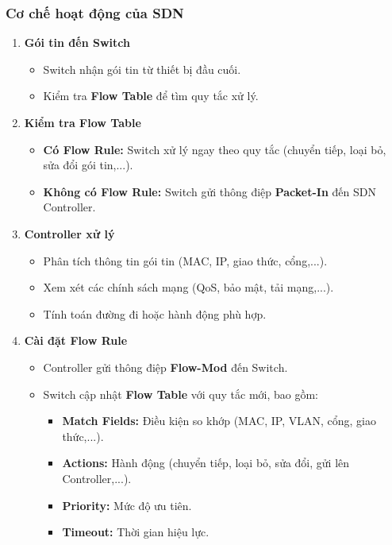 \subsubsection{Cơ chế hoạt động của SDN}
\begin{enumerate}
    \item \textbf{Gói tin đến Switch}
    \begin{itemize}
        \item Switch nhận gói tin từ thiết bị đầu cuối.
        \item Kiểm tra \textbf{Flow Table} để tìm quy tắc xử lý.
    \end{itemize}

    \item \textbf{Kiểm tra Flow Table}
    \begin{itemize}
        \item \textbf{Có Flow Rule:} Switch xử lý ngay theo quy tắc (chuyển tiếp, loại bỏ, sửa đổi gói tin,...).
        \item \textbf{Không có Flow Rule:} Switch gửi thông điệp \textbf{Packet-In} đến SDN Controller.
    \end{itemize}

    \item \textbf{Controller xử lý}
    \begin{itemize}
        \item Phân tích thông tin gói tin (MAC, IP, giao thức, cổng,...).
        \item Xem xét các chính sách mạng (QoS, bảo mật, tải mạng,...).
        \item Tính toán đường đi hoặc hành động phù hợp.
    \end{itemize}

    \item \textbf{Cài đặt Flow Rule}
    \begin{itemize}
        \item Controller gửi thông điệp \textbf{Flow-Mod} đến Switch.
        \item Switch cập nhật \textbf{Flow Table} với quy tắc mới, bao gồm:
        \begin{itemize}
            \item \textbf{Match Fields:} Điều kiện so khớp (MAC, IP, VLAN, cổng, giao thức,...).
            \item \textbf{Actions:} Hành động (chuyển tiếp, loại bỏ, sửa đổi, gửi lên Controller,...).
            \item \textbf{Priority:} Mức độ ưu tiên.
            \item \textbf{Timeout:} Thời gian hiệu lực.
        \end{itemize}
    \end{itemize}


\end{enumerate}
